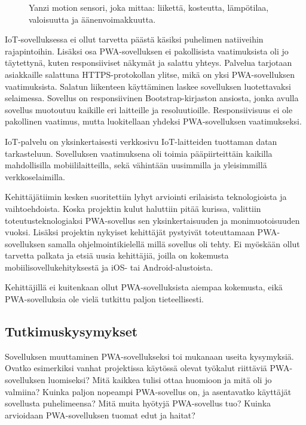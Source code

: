 \documentclass{tktltiki}
\begin{document}
\begin{figure}[h]
\begin{center}
\caption{Yanzi motion sensori, joka mittaa: liikettä, kosteutta, lämpötilaa, valoisuutta ja äänenvoimakkuutta.}
\label{Yanzi sensori}
\end{center}
\end{figure}

IoT-sovelluksessa ei ollut tarvetta päästä käsiksi puhelimen natiiveihin rajapintoihin. Lisäksi osa PWA-sovelluksen ei pakollisista vaatimuksista oli jo täytettynä, kuten responsiiviset näkymät ja salattu yhteys. Palvelua tarjotaan asiakkaille salattuna HTTPS-protokollan ylitse, mikä on yksi PWA-sovelluksen vaatimuksista. Salatun liikenteen käyttäminen laskee sovelluksen luotettavaksi selaimessa. Sovellus on responsiivinen Bootstrap-kirjaston ansiosta, jonka avulla sovellus muotoutuu kaikille eri laitteille ja resoluutioille. Responsiivisuus ei ole pakollinen vaatimus, mutta luokitellaan yhdeksi PWA-sovelluksen vaatimukseksi.

IoT-palvelu on yksinkertaisesti verkkosivu IoT-laitteiden tuottaman datan tarkasteluun. Sovelluksen vaatimuksena oli toimia pääpiirteittäin kaikilla mahdollisilla mobiililaitteilla, sekä vähintään uusimmilla ja yleisimmillä verkkoselaimilla.

Kehittäjätiimin kesken suoritettiin lyhyt arviointi erilaisista teknologioista ja vaihtoehdoista. Koska projektin kulut haluttiin pitää kurissa, valittiin toteutusteknologiaksi PWA-sovellus sen yksinkertaisuuden ja monimuotoisuuden vuoksi. Lisäksi projektin nykyiset kehittäjät pystyivät toteuttamaan PWA-sovelluksen samalla ohjelmointikielellä millä sovellus oli tehty. Ei myöskään ollut tarvetta palkata ja etsiä uusia kehittäjiä, joilla on kokemusta mobiilisovellukehityksestä ja iOS- tai Android-alustoista.

Kehittäjillä ei kuitenkaan ollut PWA-sovelluksista aiempaa kokemusta, eikä PWA-sovelluksia ole vielä tutkittu paljon tieteellisesti.

\subsection{Tutkimuskysymykset}

Sovelluksen muuttaminen PWA-sovellukseksi toi mukanaan useita kysymyksiä. Ovatko esimerkiksi vanhat projektissa käytössä olevat työkalut riittäviä PWA-sovelluksen luomiseksi? Mitä kaikkea tulisi ottaa huomioon ja mitä oli jo valmiina? Kuinka paljon nopeampi PWA-sovellus on, ja asentavatko käyttäjät sovellusta puhelimeensa? Mitä muita hyötyjä PWA-sovellus tuo? Kuinka arvioidaan PWA-sovelluksen tuomat edut ja haitat?
\end{document}
